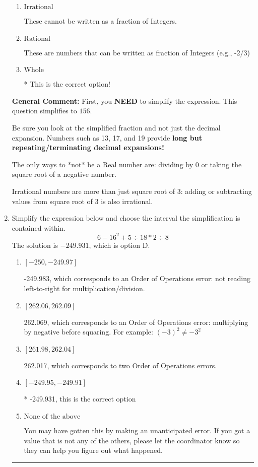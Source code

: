 \documentclass{extbook}[14pt]
\newcommand{\litem}[1]{\item #1

\rule{\textwidth}{0.4pt}}
\begin{document}
\begin{enumerate}
{\begin{enumerate}[label=\Alph*.]
These are Nonreal Complex numbers \textbf{OR} things that are not numbers (e.g., dividing by 0).
\item \( \text{Irrational} \)

These cannot be written as a fraction of Integers.
\item \( \text{Rational} \)

These are numbers that can be written as fraction of Integers (e.g., -2/3)
\item \( \text{Whole} \)

* This is the correct option!
\end{enumerate}

\textbf{General Comment:} First, you \textbf{NEED} to simplify the expression. This question simplifies to $156$. 
 
 Be sure you look at the simplified fraction and not just the decimal expansion. Numbers such as 13, 17, and 19 provide \textbf{long but repeating/terminating decimal expansions!} 
 
 The only ways to *not* be a Real number are: dividing by 0 or taking the square root of a negative number. 
 
 Irrational numbers are more than just square root of 3: adding or subtracting values from square root of 3 is also irrational.
}
\litem{
Simplify the expression below and choose the interval the simplification is contained within.
\[ 6 - 16^2 + 5 \div 18 * 2 \div 8 \]
The solution is \( -249.931 \), which is option D.\begin{enumerate}[label=\Alph*.]
\item \( [-250, -249.97] \)

 -249.983, which corresponds to an Order of Operations error: not reading left-to-right for multiplication/division.
\item \( [262.06, 262.09] \)

 262.069, which corresponds to an Order of Operations error: multiplying by negative before squaring. For example: $(-3)^2 \neq -3^2$
\item \( [261.98, 262.04] \)

 262.017, which corresponds to two Order of Operations errors.
\item \( [-249.95, -249.91] \)

* -249.931, this is the correct option
\item \( \text{None of the above} \)

 You may have gotten this by making an unanticipated error. If you got a value that is not any of the others, please let the coordinator know so they can help you figure out what happened.
\end{enumerate}

}
\end{enumerate}
\end{document}
